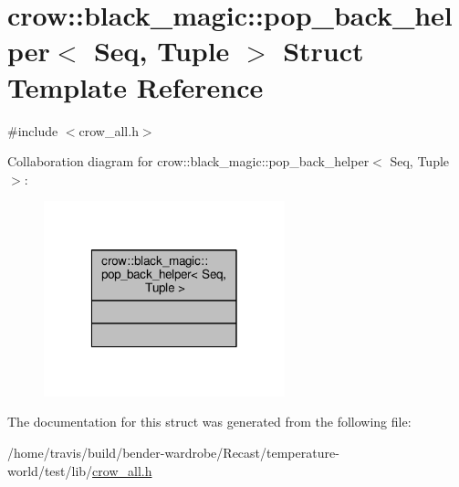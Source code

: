 \hypertarget{structcrow_1_1black__magic_1_1pop__back__helper}{\section{crow\-:\-:black\-\_\-magic\-:\-:pop\-\_\-back\-\_\-helper$<$ Seq, Tuple $>$ Struct Template Reference}
\label{structcrow_1_1black__magic_1_1pop__back__helper}
}


{\ttfamily \#include $<$crow\-\_\-all.\-h$>$}



Collaboration diagram for crow\-:\-:black\-\_\-magic\-:\-:pop\-\_\-back\-\_\-helper$<$ Seq, Tuple $>$\-:
\nopagebreak
\begin{figure}[H]
\begin{center}
\leavevmode
\includegraphics[width=198pt]{structcrow_1_1black__magic_1_1pop__back__helper__coll__graph}
\end{center}
\end{figure}


The documentation for this struct was generated from the following file\-:\begin{DoxyCompactItemize}
\item 
/home/travis/build/bender-\/wardrobe/\-Recast/temperature-\/world/test/lib/\hyperlink{crow__all_8h}{crow\-\_\-all.\-h}\end{DoxyCompactItemize}
